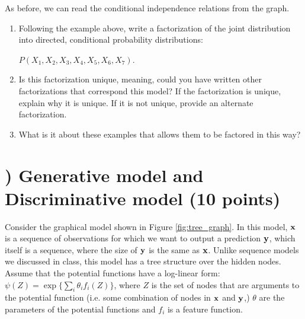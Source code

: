 \documentclass[11pt]{article}
\newcommand{\vx}{{\bf x}}
\newcommand{\vy}{{\bf y}}
\newcounter{QuestionCounter}
\newcounter{SubQuestionCounter}[QuestionCounter]
\newcommand{\newquestion}{\stepcounter{QuestionCounter}\setcounter{SubQuestionCounter}{1}\newpage}
\begin{document}
As before, we can read the conditional independence relations from the graph. 
\begin{enumerate}[label=(\alph*)]
\item Following the example above, write a factorization of the joint distribution into directed, conditional probability distributions:

\begin{center}
$P(X_1,X_2,X_3,X_4,X_5,X_6,X_7)$.
\end{center}

\begin{answertext}{3 cm}{}

\end{answertext}

\item Is this factorization unique, meaning, could you have written other factorizations that correspond this model? If the factorization is unique, explain why it is unique. If it is not unique, provide an alternate factorization.

\begin{answertext}{5 cm}{}

\end{answertext}

\item What is it about these examples that allows them to be factored in this way?

\begin{answertext}{9 cm}{}

\end{answertext}
\end{enumerate}

\newquestion
\section*{) Generative model and Discriminative model (10 points)}
Consider the graphical model shown in Figure \ref{fig:tree_graph}. In this model, $\vx$ is a sequence of observations for which we want to output a prediction $\vy$, which itself is a sequence, where the size of $\vy$ is the same as $\vx$. Unlike sequence models we discussed in class, this model has a tree structure over the hidden nodes. Assume that the potential functions have a log-linear form: $\psi(Z) = \exp\{\sum_i \theta_i f_i(Z)\}$, where $Z$ is the set of nodes that are arguments to the potential function (i.e. some combination of nodes in $\vx$ and $\vy$,) $\theta$ are the parameters of the potential functions and $f_i$ is a feature function.
\end{document}
